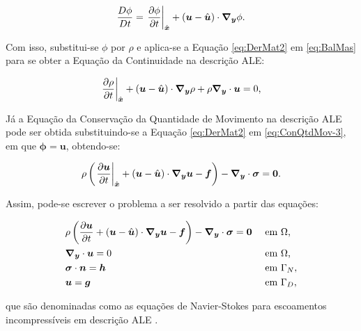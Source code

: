 \begin{equation}
    \frac{D\phi}{Dt}=\left.\frac{\partial{\phi}}{\partial{t}}\right|_{\hat{\boldsymbol{x}}}+(\boldsymbol{u}-\hat{\boldsymbol{u}})\cdot\boldsymbol{\nabla_y}\phi\text{.}
    \label{eq:DerMat2}
\end{equation}

Com isso, substitui-se $\phi$ por $\rho$ e aplica-se a Equação \eqref{eq:DerMat2} em \eqref{eq:BalMas} para se obter a Equação da Continuidade na descrição ALE:

\begin{equation}
    \left.\frac{\partial{\rho}}{\partial{t}}\right|_{\hat{\boldsymbol{x}}}+(\boldsymbol{u}-\hat{\boldsymbol{u}})\cdot\boldsymbol{\nabla_y}\rho+\rho\boldsymbol{\nabla_y}\cdot\boldsymbol{u}=0\text{,}
    \label{ConMas4}
\end{equation}

Já a Equação da Conservação da Quantidade de Movimento na descrição ALE pode ser obtida substituindo-se a Equação \eqref{eq:DerMat2} em \eqref{eq:ConQtdMov-3}, em que $\mathbf{\phi}=\mathbf{u}$, obtendo-se:

\begin{equation}
    \rho\left(\left.\frac{\partial{\boldsymbol{u}}}{\partial{t}}\right|_{\hat{\boldsymbol{x}}}+(\boldsymbol{u}-\hat{\boldsymbol{u}})\cdot\boldsymbol{\nabla_y}\boldsymbol{u}-\boldsymbol{f}\right)-\boldsymbol{\nabla_y}\cdot\boldsymbol{\sigma}=\boldsymbol{0}\text{.}
    \label{ConQtdMov10}
\end{equation}

Assim, pode-se escrever o problema a ser resolvido a partir das equações:

\begin{subequations}
    \begin{align}
         & \rho\left({\frac{\partial{\boldsymbol{u}}}{\partial t}+(\boldsymbol{u}-\hat{\boldsymbol{u}})\cdot\boldsymbol{\nabla_y}\boldsymbol{u}-\boldsymbol{f}}\right)-\boldsymbol{\nabla_y}\cdot\boldsymbol{\sigma}=\boldsymbol{0} &  & \text{ em }\Omega\text{,}   \label{eq:ALE-mov}  \\
         & \boldsymbol{\nabla_y}\cdot\boldsymbol{u}=0                                                                     &  & \text{ em }\Omega\text{,}   \label{eq:ALE-cont} \\
         & \boldsymbol{\sigma}\cdot\boldsymbol{n}=\boldsymbol{h}                                                              &  & \text{ em }\Gamma_N\text{,}                     \\
         & \boldsymbol{u}=\boldsymbol{g}                                                                        &  & \text{ em }\Gamma_D\text{,}
    \end{align}
    \label{eq:NS-ALE}
\end{subequations}

\noindent que são denominadas como as equações de Navier-Stokes para escoamentos incompressíveis em descrição ALE \cite{bazilevs2013computational}.


